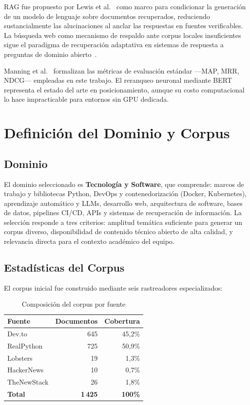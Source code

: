 \documentclass[runningheads,a4paper]{llncs}
\begin{document}
RAG fue propuesto por Lewis et al.~\cite{lewis2020} como marco para condicionar la generación de un modelo de lenguaje sobre documentos recuperados, reduciendo sustancialmente las alucinaciones al anclar las respuestas en fuentes verificables. La búsqueda web como mecanismo de respaldo ante corpus locales insuficientes sigue el paradigma de recuperación adaptativa en sistemas de respuesta a preguntas de dominio abierto~\cite{karpukhin2020}.

Manning et al.~\cite{manning2008} formalizan las métricas de evaluación estándar —MAP, MRR, NDCG— empleadas en este trabajo. El reranqueo neuronal mediante BERT~\cite{nogueira2019} representa el estado del arte en posicionamiento, aunque su costo computacional lo hace impracticable para entornos sin GPU dedicada.

\section{Definición del Dominio y Corpus}

\subsection{Dominio}

El dominio seleccionado es \textbf{Tecnología y Software}, que comprende: marcos de trabajo y bibliotecas Python, DevOps y contenedorización (Docker, Kubernetes), aprendizaje automático y LLMs, desarrollo web, arquitectura de software, bases de datos, pipelines CI/CD, APIs y sistemas de recuperación de información. La selección responde a tres criterios: amplitud temática suficiente para generar un corpus diverso, disponibilidad de contenido técnico abierto de alta calidad, y relevancia directa para el contexto académico del equipo.

\subsection{Estadísticas del Corpus}

El corpus inicial fue construido mediante seis rastreadores especializados:

\begin{table}[h]
\caption{Composición del corpus por fuente}
\centering
\begin{tabular}{lrr}
\hline
\textbf{Fuente} & \textbf{Documentos} & \textbf{Cobertura} \\
\hline
Dev.to & 645 & 45,2\% \\
RealPython & 725 & 50,9\% \\
Lobsters & 19 & 1,3\% \\
HackerNews & 10 & 0,7\% \\
TheNewStack & 26 & 1,8\% \\
\hline
\textbf{Total} & \textbf{1\,425} & \textbf{100\%} \\
\hline
\end{tabular}
\end{table}
\end{document}
